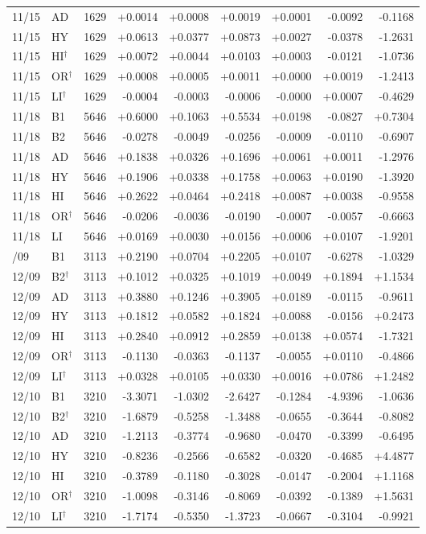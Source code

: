 \begin{longtable}{@{}llrrrrrrr@{}}
11/15 & AD & 1629 & +0.0014 & +0.0008 & +0.0019 & +0.0001 & -0.0092 & -0.1168 \\
11/15 & HY & 1629 & +0.0613 & +0.0377 & +0.0873 & +0.0027 & -0.0378 & -1.2631 \\
11/15 & HI$^{\dagger}$ & 1629 & +0.0072 & +0.0044 & +0.0103 & +0.0003 & -0.0121 & -1.0736 \\
11/15 & OR$^{\dagger}$ & 1629 & +0.0008 & +0.0005 & +0.0011 & +0.0000 & +0.0019 & -1.2413 \\
11/15 & LI$^{\dagger}$ & 1629 & -0.0004 & -0.0003 & -0.0006 & -0.0000 & +0.0007 & -0.4629 \\
\midrule
11/18 & B1 & 5646 & +0.6000 & +0.1063 & +0.5534 & +0.0198 & -0.0827 & +0.7304 \\
11/18 & B2 & 5646 & -0.0278 & -0.0049 & -0.0256 & -0.0009 & -0.0110 & -0.6907 \\
11/18 & AD & 5646 & +0.1838 & +0.0326 & +0.1696 & +0.0061 & +0.0011 & -1.2976 \\
11/18 & HY & 5646 & +0.1906 & +0.0338 & +0.1758 & +0.0063 & +0.0190 & -1.3920 \\
11/18 & HI & 5646 & +0.2622 & +0.0464 & +0.2418 & +0.0087 & +0.0038 & -0.9558 \\
11/18 & OR$^{\dagger}$ & 5646 & -0.0206 & -0.0036 & -0.0190 & -0.0007 & -0.0057 & -0.6663 \\
11/18 & LI & 5646 & +0.0169 & +0.0030 & +0.0156 & +0.0006 & +0.0107 & -1.9201 \\
\pagebreak
12/09 & B1 & 3113 & +0.2190 & +0.0704 & +0.2205 & +0.0107 & -0.6278 & -1.0329 \\
12/09 & B2$^{\dagger}$ & 3113 & +0.1012 & +0.0325 & +0.1019 & +0.0049 & +0.1894 & +1.1534 \\
12/09 & AD & 3113 & +0.3880 & +0.1246 & +0.3905 & +0.0189 & -0.0115 & -0.9611 \\
12/09 & HY & 3113 & +0.1812 & +0.0582 & +0.1824 & +0.0088 & -0.0156 & +0.2473 \\
12/09 & HI & 3113 & +0.2840 & +0.0912 & +0.2859 & +0.0138 & +0.0574 & -1.7321 \\
12/09 & OR$^{\dagger}$ & 3113 & -0.1130 & -0.0363 & -0.1137 & -0.0055 & +0.0110 & -0.4866 \\
12/09 & LI$^{\dagger}$ & 3113 & +0.0328 & +0.0105 & +0.0330 & +0.0016 & +0.0786 & +1.2482 \\
\midrule
12/10 & B1 & 3210 & -3.3071 & -1.0302 & -2.6427 & -0.1284 & -4.9396 & -1.0636 \\
12/10 & B2$^{\dagger}$ & 3210 & -1.6879 & -0.5258 & -1.3488 & -0.0655 & -0.3644 & -0.8082 \\
12/10 & AD & 3210 & -1.2113 & -0.3774 & -0.9680 & -0.0470 & -0.3399 & -0.6495 \\
12/10 & HY & 3210 & -0.8236 & -0.2566 & -0.6582 & -0.0320 & -0.4685 & +4.4877 \\
12/10 & HI & 3210 & -0.3789 & -0.1180 & -0.3028 & -0.0147 & -0.2004 & +1.1168 \\
12/10 & OR$^{\dagger}$ & 3210 & -1.0098 & -0.3146 & -0.8069 & -0.0392 & -0.1389 & +1.5631 \\
12/10 & LI$^{\dagger}$ & 3210 & -1.7174 & -0.5350 & -1.3723 & -0.0667 & -0.3104 & -0.9921 \\
\end{longtable}
